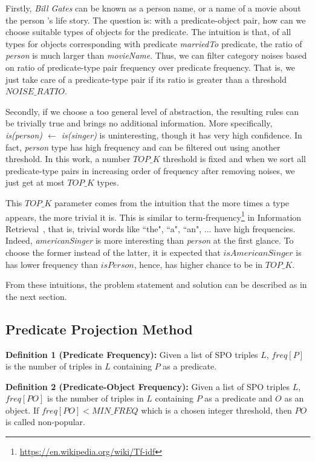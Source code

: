 \documentclass{acm_proc_article-sp}
\begin{document}
Firstly, \textit{Bill Gates} can be known as a person name, or a name of a movie about the person 's life story. The question is: with a predicate-object pair, how can we choose suitable types of objects for the predicate. The intuition is that, of all types for objects corresponding with predicate \textit{marriedTo} predicate, the ratio of \textit{person} is much larger than \textit{movieName}. Thus, we can filter category noises based on ratio of predicate-type pair frequency over predicate frequency. That is, we just take care of a predicate-type pair if its ratio is greater than a threshold $NOISE\_RATIO$.

Secondly, if we choose a too general level of abstraction, the resulting rules can be trivially true and brings no additional information. More specifically, \textit{is(person) $\leftarrow$ is(singer)} is uninteresting, though it has very high confidence. In fact, \textit{person} type has high frequency and can be filtered out using another threshold. In this work, a number $TOP\_K$ threshold is fixed and when we sort all predicate-type pairs in increasing order of frequency after removing noises, we just get at most $TOP\_K$ types.

This $TOP\_K$ parameter comes from the intuition that the more times a type appears, the more trivial it is. This is similar to term-frequency\footnote{\url{https://en.wikipedia.org/wiki/Tf-idf}} in Information Retrieval~\cite{ref2}, that is, trivial words like ``the", ``a", ``an", ... have high frequencies. Indeed, \textit{americanSinger} is more interesting than \textit{person} at the first glance. To choose the former instead of the latter, it is expected that $isAmericanSinger$ is has lower frequency than $isPerson$, hence, has higher chance to be in $TOP\_K$.

From these intuitions, the problem statement and solution can be described as in the next section.

\subsection{Predicate Projection Method\\}

\textbf{Definition 1 (Predicate Frequency):} Given a list of SPO triples $L$, $freq[P]$ is the number of triples in $L$ containing $P$ as a predicate.

\textbf{Definition 2 (Predicate-Object Frequency):} Given a list of SPO triples $L$, $freq[PO]$ is the number of triples in $L$ containing $P$ as a predicate and $O$ as an object. If $freq[PO] < MIN\_FREQ$ which is a chosen integer threshold, then $PO$ is called non-popular.
\end{document}
